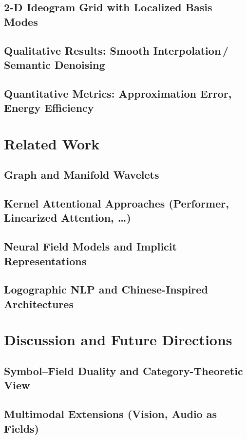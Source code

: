 \documentclass[11pt]{article}
\begin{document}
\subsection{2-D Ideogram Grid with Localized Basis Modes}
\subsection{Qualitative Results: Smooth Interpolation\,/\,Semantic Denoising}
\subsection{Quantitative Metrics: Approximation Error, Energy Efficiency}

\section{Related Work}
\subsection{Graph and Manifold Wavelets}
\subsection{Kernel Attentional Approaches (Performer, Linearized Attention, …)}
\subsection{Neural Field Models and Implicit Representations}
\subsection{Logographic NLP and Chinese-Inspired Architectures}

\section{Discussion and Future Directions}
\subsection{Symbol–Field Duality and Category-Theoretic View}
\subsection{Multimodal Extensions (Vision, Audio as Fields)}
\end{document}

